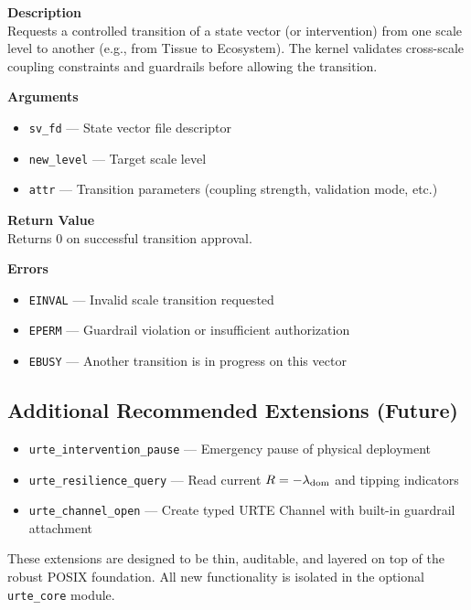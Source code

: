 \documentclass[11pt,a4paper]{report}
\begin{document}
\textbf{Description}\\
Requests a controlled transition of a state vector (or intervention) from one scale level to another (e.g., from Tissue to Ecosystem). The kernel validates cross-scale coupling constraints and guardrails before allowing the transition.

\textbf{Arguments}
\begin{itemize}
    \item \texttt{sv\_fd} — State vector file descriptor
    \item \texttt{new\_level} — Target scale level
    \item \texttt{attr} — Transition parameters (coupling strength, validation mode, etc.)
\end{itemize}

\textbf{Return Value}\\
Returns 0 on successful transition approval.

\textbf{Errors}
\begin{itemize}
    \item \texttt{EINVAL} — Invalid scale transition requested
    \item \texttt{EPERM} — Guardrail violation or insufficient authorization
    \item \texttt{EBUSY} — Another transition is in progress on this vector
\end{itemize}

\subsection{Additional Recommended Extensions (Future)}

\begin{itemize}
    \item \texttt{urte\_intervention\_pause} — Emergency pause of physical deployment
    \item \texttt{urte\_resilience\_query} — Read current $R = -\lambda_{\rm dom}$ and tipping indicators
    \item \texttt{urte\_channel\_open} — Create typed URTE Channel with built-in guardrail attachment
\end{itemize}

These extensions are designed to be thin, auditable, and layered on top of the robust POSIX foundation. All new functionality is isolated in the optional \texttt{urte\_core} module.

\end{document}
